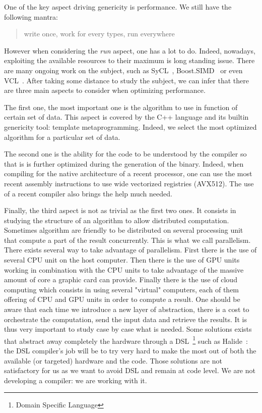 One of the key aspect driving genericity is performance. We still have the following mantra: \blockquote{write once,
  work for every types, run everywhere}. However when considering the \emph{run} aspect, one has a lot to do. Indeed,
nowadays, exploiting the available resources to their maximum is long standing issue. There are many ongoing work on the
subject, such as SyCL~\cite{brown.2019.heterogeneous,wong.2019.heterogeneous}, Boost.SIMD~\cite{esterie.2014.boostsimd}
or even VCL~\cite{fog.2013.vcl}. After taking some distance to study the subject, we can infer that there are three main
aspects to consider when optimizing performance.

The first one, the most important one is the algorithm to use in function of certain set of data. This aspect is covered
by the C++ language and its builtin genericity tool: template metaprogramming. Indeed, we select the most optimized
algorithm for a particular set of data.

The second one is the ability for the code to be understood by the compiler so that is is further optimized during the
generation of the binary. Indeed, when compiling for the native architecture of a recent processor, one can use the most
recent assembly instructions to use wide vectorized registries (AVX512). The use of a recent compiler also brings the
help much needed.

Finally, the third aspect is not as trivial as the first two ones. It consists in studying the structure of an algorithm
to allow distributed computation. Sometimes algorithm are friendly to be distributed on several processing unit that
compute a part of the result concurrently. This is what we call parallelism. There exists several way to take advantage
of parallelism. First there is the use of several CPU unit on the host computer. Then there is the use of GPU units
working in combination with the CPU units to take advantage of the massive amount of core a graphic card can provide.
Finally there is the use of cloud computing which consists in using several "virtual" computers, each of them offering
of CPU and GPU units in order to compute a result. One should be aware that each time we introduce a new layer of
abstraction, there is a cost to orchestrate the computation, send the input data and retrieve the results. It is thus
very important to study case by case what is needed. Some solutions exists that abstract away completely the hardware
through a DSL~\footnote{Domain Specific Language} such as Halide~\cite{ragankelley.2013.halide}: the DSL compiler's job
will be to try very hard to make the most out of both the available (or targeted) hardware and the code. Those solutions
are not satisfactory for us as we want to avoid DSL and remain at code level. We are not developing a compiler: we are
working with it.

